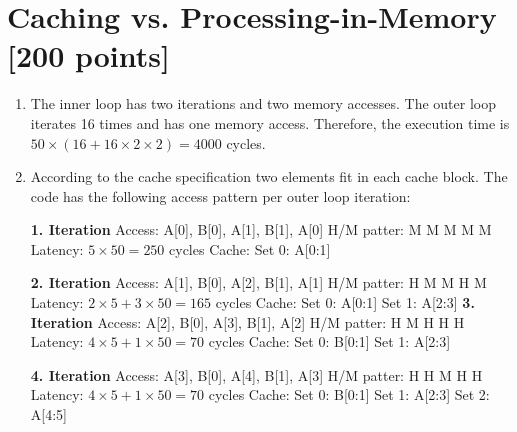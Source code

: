 \documentclass[a4paper]{article}
\begin{document}
\section{Caching vs. Processing-in-Memory [200 points]}

\begin{enumerate}[label=\alph*)]
    \item The inner loop has two iterations and two memory accesses. The outer loop iterates 16 times
        and has one memory access. Therefore, the execution time is 
        $50 \times (16 + 16 \times 2 \times 2) = 4000$ cycles.
    
    \item According to the cache specification two elements fit in each cache block. The code has 
        the following access pattern per outer loop iteration:

        \textbf{1. Iteration} \newline
        Access: A[0], B[0], A[1], B[1], A[0] \newline
        H/M patter: M M M M M \newline
        Latency: $5 \times 50 = 250$ cycles \newline
        Cache: Set 0: A[0:1] \newline
        
        \textbf{2. Iteration} \newline
        Access: A[1], B[0], A[2], B[1], A[1] \newline
        H/M patter: H M M H M \newline
        Latency: $2 \times 5 + 3 \times 50 = 165$ cycles \newline
        Cache: Set 0: A[0:1] Set 1: A[2:3] \newline
\newpage
        \textbf{3. Iteration} \newline
        Access: A[2], B[0], A[3], B[1], A[2] \newline
        H/M patter: H M H H H \newline
        Latency: $4 \times 5 + 1 \times 50 = 70$ cycles \newline
        Cache: Set 0: B[0:1] Set 1: A[2:3] \newline
        
        \textbf{4. Iteration} \newline
        Access: A[3], B[0], A[4], B[1], A[3] \newline
        H/M patter: H H M H H \newline
        Latency: $4 \times 5 + 1 \times 50 = 70$ cycles \newline
        Cache: Set 0: B[0:1] Set 1: A[2:3] Set 2: A[4:5] \newline
        

\end{enumerate}
\end{document}
